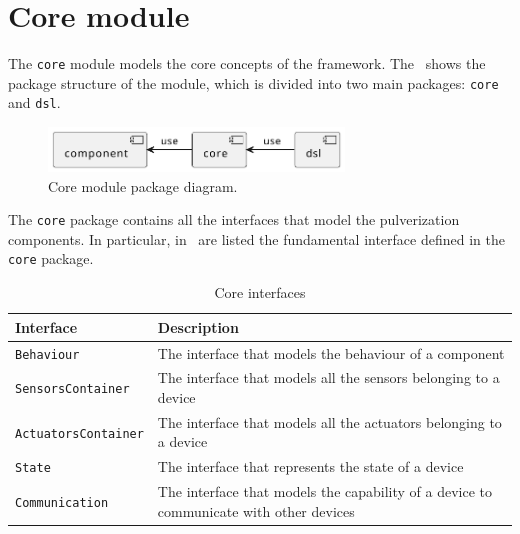 
\section{Core module}
\label{sec:core-module-impl}

The \texttt{core} module models the core concepts of the framework. The~ shows the package structure of the module, which
is divided into two main packages: \texttt{core} and \texttt{dsl}.

\begin{figure}[ht]
	\centering
	\includegraphics[width=0.7\textwidth]{figures/core-package-diagram.pdf}
	\caption{Core module package diagram.}
	\label{fig:core-module-impl}
\end{figure}

The \texttt{core} package contains all the interfaces that model the pulverization components.
In particular, in~ are listed the fundamental interface defined in the \texttt{core} package.

\begin{table}[ht]
	\begin{tabularx}{\textwidth}{l X}
		\toprule
		Interface                   & Description                                                                            \\ \midrule
		\texttt{Behaviour}          & The interface that models the behaviour of a component                                 \\
		\texttt{SensorsContainer}   & The interface that models all the sensors belonging to a device                        \\
		\texttt{ActuatorsContainer} & The interface that models all the actuators belonging to a device                      \\
		\texttt{State}              & The interface that represents the state of a device                                    \\
		\texttt{Communication}      & The interface that models the capability of a device to communicate with other devices \\ \bottomrule
	\end{tabularx}
	\caption{Core interfaces}
	\label{tab:core-interfaces}
\end{table}

